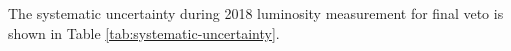 






The systematic uncertainty during 2018 luminosity measurement for final veto is shown in Table \ref{tab:systematic-uncertainty}.  

